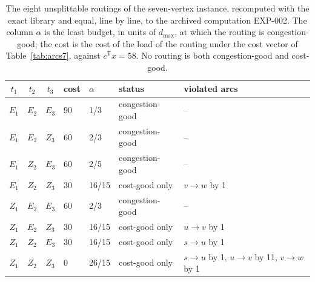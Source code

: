 \begin{table}[t]
\centering\small
\begin{tabular}{@{}ccclll>{\raggedright\arraybackslash}p{4.6cm}@{}}
\toprule
$t_1$ & $t_2$ & $t_3$ & cost & $\alpha$ & status & violated arcs\\
\midrule
$E_1$ & $E_2$ & $E_3$ & 90 & 1/3 & congestion-good & --\\
$E_1$ & $E_2$ & $Z_3$ & 60 & 2/3 & congestion-good & --\\
$E_1$ & $Z_2$ & $E_3$ & 60 & 2/5 & congestion-good & --\\
$E_1$ & $Z_2$ & $Z_3$ & 30 & 16/15 & cost-good only & $v\to w$ by 1\\
$Z_1$ & $E_2$ & $E_3$ & 60 & 2/3 & congestion-good & --\\
$Z_1$ & $E_2$ & $Z_3$ & 30 & 16/15 & cost-good only & $u\to v$ by 1\\
$Z_1$ & $Z_2$ & $E_3$ & 30 & 16/15 & cost-good only & $s\to u$ by 1\\
$Z_1$ & $Z_2$ & $Z_3$ & 0 & 26/15 & cost-good only & $s\to u$ by 1, $u\to v$ by 11, $v\to w$ by 1\\
\bottomrule
\end{tabular}
\caption{The eight unsplittable routings of the seven-vertex instance, recomputed with the exact library and equal, line by line, to the archived computation EXP-002. The column $\alpha$ is the least budget, in units of $d_{\max}$, at which the routing is congestion-good; the cost is the cost of the load of the routing under the cost vector of Table~\ref{tab:arcs7}, against $c^{\mathsf T}x=58$. No routing is both congestion-good and cost-good.}
\label{tab:routings}
\end{table}
